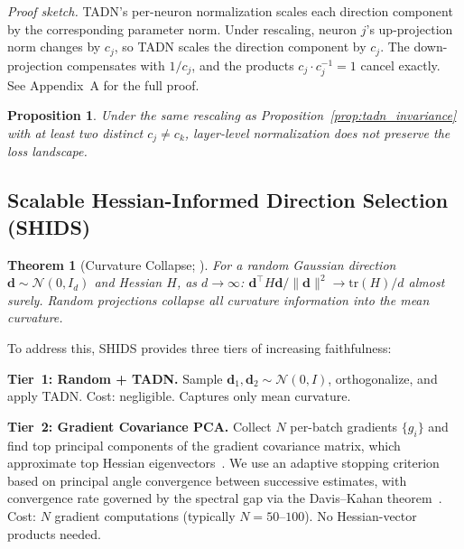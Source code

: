 \documentclass{article}
\newtheorem{theorem}{Theorem}
\newtheorem{proposition}{Proposition}
\begin{document}
\emph{Proof sketch.} TADN's per-neuron normalization scales each direction component by the corresponding parameter norm. Under rescaling, neuron $j$'s up-projection norm changes by $c_j$, so TADN scales the direction component by $c_j$. The down-projection compensates with $1/c_j$, and the products $c_j \cdot c_j^{-1} = 1$ cancel exactly. See Appendix~A for the full proof.

\begin{proposition}
\label{prop:layer_fails}
Under the same rescaling as Proposition~\ref{prop:tadn_invariance} with at least two distinct $c_j \neq c_k$, layer-level normalization does \emph{not} preserve the loss landscape.
\end{proposition}

\subsection{Scalable Hessian-Informed Direction Selection (SHIDS)}
\label{sec:shids}

\begin{theorem}[Curvature Collapse; \citealt{bottcher2024visualizing}]
\label{thm:collapse}
For a random Gaussian direction $\mathbf{d} \sim \mathcal{N}(0, I_d)$ and Hessian $H$, as $d \to \infty$: $\mathbf{d}^\top H \mathbf{d} / \|\mathbf{d}\|^2 \to \mathrm{tr}(H)/d$ almost surely. Random projections collapse all curvature information into the mean curvature.
\end{theorem}

To address this, SHIDS provides three tiers of increasing faithfulness:

\textbf{Tier~1: Random + TADN.} Sample $\mathbf{d}_1, \mathbf{d}_2 \sim \mathcal{N}(0, I)$, orthogonalize, and apply TADN. Cost: negligible. Captures only mean curvature.

\textbf{Tier~2: Gradient Covariance PCA.} Collect $N$ per-batch gradients $\{g_i\}$ and find top principal components of the gradient covariance matrix, which approximate top Hessian eigenvectors~\citep{gurari2018gradient}. We use an adaptive stopping criterion based on principal angle convergence between successive estimates, with convergence rate governed by the spectral gap via the Davis--Kahan theorem~\citep{davis1970rotation}. Cost: $N$ gradient computations (typically $N=50$--$100$). No Hessian-vector products needed.
\end{document}
